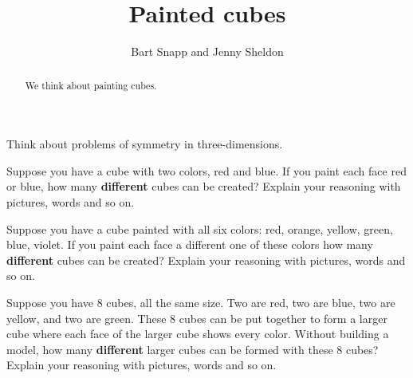 \documentclass[noauthor,nooutcomes,hints,handout]{ximera}
\title{Painted cubes}
\author{Bart Snapp and Jenny Sheldon}
\begin{document}
\begin{abstract}
  We think about painting cubes.
\end{abstract}
\maketitle

\begin{listOutcomes}
\item Think about problems of symmetry in three-dimensions.
\end{listOutcomes}
\mynewpage


\begin{question}
  Suppose you have a cube with two colors, red and blue. If you paint
  each face red or blue, how many \textbf{different} cubes can be created?
  Explain your reasoning with pictures, words and so on.
\end{question}
\mynewpage



\begin{question}%
  Suppose you have a cube painted with all six colors: red, orange,
  yellow, green, blue, violet. If you paint each face a different one
  of these colors how many \textbf{different} cubes can be created?
  Explain your reasoning with pictures, words and so on.
\end{question}
\mynewpage



\begin{question}
  Suppose you have $8$ cubes, all the same size. Two are red, two are
  blue, two are yellow, and two are green. These 8 cubes can be put
  together to form a larger cube where each face of the larger cube
  shows every color. Without building a model, how many
  \textbf{different} larger cubes can be formed with these $8$ cubes?
  Explain your reasoning with pictures, words and so on.
\end{question}
\end{document}
